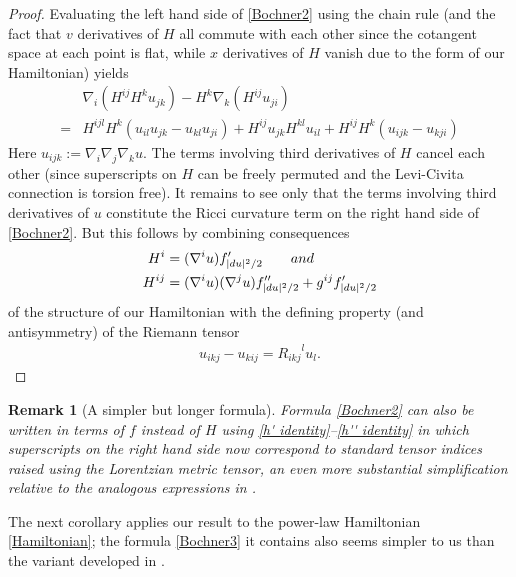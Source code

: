 \documentclass[12pt]{amsart}
\renewcommand{\d}{{d}}
\newtheorem{remark}[theorem]{Remark}
\begin{document}
\begin{proof}
Evaluating  the left hand side of \eqref{Bochner2} using the chain rule (and the fact that $v$ derivatives of $H$ all commute with each other
since the cotangent space at each point is flat,  while $x$ derivatives of $H$ vanish due to the form of our Hamiltonian) yields
\begin{align*}
&\nabla_i(H^{ij}H^ku_{jk}) - H^k \nabla_k(H^{ij} u_{ji})
\\=&H^{ijl}H^k(u_{il}u_{jk}-u_{kl}u_{ji}) + H^{ij}u_{jk} H^{kl} u_{il} +H^{ij} H^k (u_{ijk}-u_{kji}) 
\end{align*}
Here $u_{ijk} := \nabla_i \nabla_j \nabla_k u$.
The terms involving third derivatives of $H$ cancel each other (since superscripts on $H$ can be freely permuted and the Levi-Civita connection is torsion free).  It remains to see only that the terms involving
third derivatives of $u$ constitute the Ricci curvature term on the right hand side of \eqref{Bochner2}.  But this follows by combining consequences
\begin{align}
\label{h' identity}
H^i &= (\nabla^i u) f'_{|\d u|^2/2} \qquad {\rm and} \qquad
\\H^{ij} &= (\nabla^i u) (\nabla^j u) 
f''_{|\d u|^2/2} + g^{ij} f'_{|\d u|^2/2}
\label{h'' identity}
\end{align}
of the structure of our Hamiltonian with the defining property (and antisymmetry) of the Riemann tensor
\begin{align*}
 u_{ikj}-u_{kij} = {R_{ikj}}^l u_l. %
\end{align*}
\end{proof}

\begin{remark}[A simpler but longer formula]\label{R:simpler but longer}
Formula \eqref{Bochner2} can also be written in terms of $f$ instead of $H$ using \eqref{h' identity}--\eqref{h'' identity} in which superscripts on the right hand side now correspond to standard tensor indices raised using the Lorentzian metric tensor,
an even more substantial simplification relative to the analogous expressions in \cite{Ohta14h}.
\end{remark}

The next corollary applies our result to the power-law Hamiltonian \eqref{Hamiltonian};  the formula \eqref{Bochner3} it contains also seems simpler to us than the variant developed in \cite[Appendix]{MondinoSuhr23}.
\end{document}
